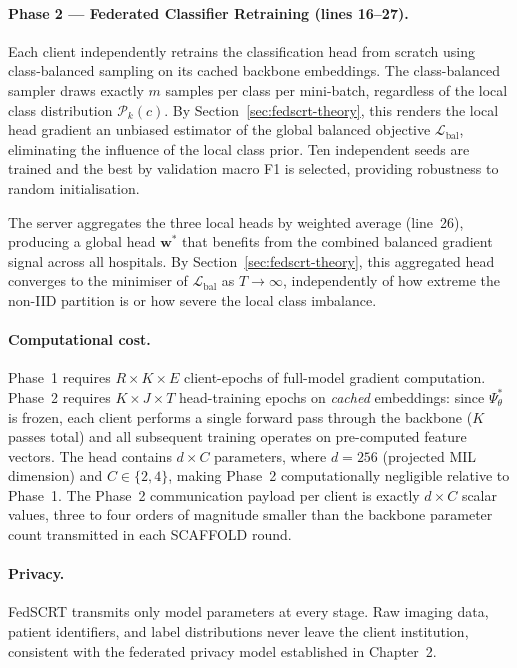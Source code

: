 \paragraph{Phase 2 --- Federated Classifier Retraining
(lines 16--27).}
Each client independently retrains the classification
head from scratch using class-balanced sampling on
its cached backbone embeddings.
The class-balanced sampler draws exactly $m$ samples
per class per mini-batch, regardless of the local
class distribution $\mathcal{P}_k(c)$.
By Section~\ref{sec:fedscrt-theory}, this renders the local
head gradient an unbiased estimator of the global
balanced objective $\mathcal{L}_{\mathrm{bal}}$,
eliminating the influence of the local class prior.
Ten independent seeds are trained and the best by
validation macro F1 is selected, providing robustness
to random initialisation.

The server aggregates the three local heads by
weighted average (line~26), producing a global head
$\mathbf{w}^*$ that benefits from the combined
balanced gradient signal across all hospitals.
By Section~\ref{sec:fedscrt-theory}, this aggregated
head converges to the minimiser of
$\mathcal{L}_{\mathrm{bal}}$ as $T \to \infty$,
independently of how extreme the non-IID partition
is or how severe the local class imbalance.

\paragraph{Computational cost.}
Phase~1 requires $R \times K \times E$ client-epochs
of full-model gradient computation.
Phase~2 requires $K \times J \times T$ head-training
epochs on \emph{cached} embeddings: since $\Psi^*_\theta$
is frozen, each client performs a single forward pass
through the backbone ($K$ passes total) and all subsequent
training operates on pre-computed feature vectors.
The head contains $d \times C$ parameters, where
$d = 256$ (projected MIL dimension) and $C \in \{2, 4\}$,
making Phase~2 computationally negligible relative
to Phase~1.
The Phase~2 communication payload per client is exactly
$d \times C$ scalar values, three to four orders of
magnitude smaller than the backbone parameter count
transmitted in each SCAFFOLD round.

\paragraph{Privacy.}
FedSCRT transmits only model parameters at every stage.
Raw imaging data, patient identifiers, and label
distributions never leave the client institution,
consistent with the federated privacy model established
in Chapter~2.

